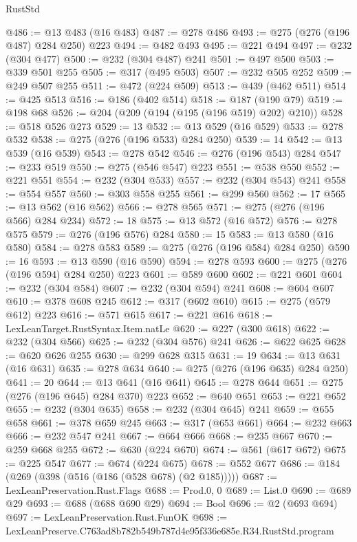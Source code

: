\begin{lexlean}{RustStd}
\begin{coremodule}
@486 := @13 @483 (@16 @483)
@487 := @278 @486
@493 := @275 (@276 (@196 @487) @284 @250) @223
@494 := @482 @493
@495 := @221 @494
@497 := @232 (@304 @477)
@500 := @232 (@304 @487) @241
@501 := @497 @500
@503 := @339 @501 @255
@505 := @317 (@495 @503)
@507 := @232 @505 @252
@509 := @249 @507 @255
@511 := @472 (@224 @509)
@513 := @439 (@462 @511)
@514 := @425 @513
@516 := @186 (@402 @514)
@518 := @187 (@190 @79)
@519 := @198 @68
@526 := @204 (@209 (@194 (@195 (@196 @519) @202) @210))
@528 := @518 @526 @273
@529 := 13
@532 := @13 @529 (@16 @529)
@533 := @278 @532
@538 := @275 (@276 (@196 @533) @284 @250)
@539 := 14
@542 := @13 @539 (@16 @539)
@543 := @278 @542
@546 := @276 (@196 @543) @284
@547 := @233 @519
@550 := @275 (@546 @547) @223
@551 := @538 @550
@552 := @221 @551
@554 := @232 (@304 @533)
@557 := @232 (@304 @543) @241
@558 := @554 @557
@560 := @303 @558 @255
@561 := @299 @560
@562 := 17
@565 := @13 @562 (@16 @562)
@566 := @278 @565
@571 := @275 (@276 (@196 @566) @284 @234)
@572 := 18
@575 := @13 @572 (@16 @572)
@576 := @278 @575
@579 := @276 (@196 @576) @284
@580 := 15
@583 := @13 @580 (@16 @580)
@584 := @278 @583
@589 := @275 (@276 (@196 @584) @284 @250)
@590 := 16
@593 := @13 @590 (@16 @590)
@594 := @278 @593
@600 := @275 (@276 (@196 @594) @284 @250) @223
@601 := @589 @600
@602 := @221 @601
@604 := @232 (@304 @584)
@607 := @232 (@304 @594) @241
@608 := @604 @607
@610 := @378 @608 @245
@612 := @317 (@602 @610)
@615 := @275 (@579 @612) @223
@616 := @571 @615
@617 := @221 @616
@618 := LexLeanTarget.RustSyntax.Item.natLe
@620 := @227 (@300 @618)
@622 := @232 (@304 @566)
@625 := @232 (@304 @576) @241
@626 := @622 @625
@628 := @620 @626 @255
@630 := @299 @628 @315
@631 := 19
@634 := @13 @631 (@16 @631)
@635 := @278 @634
@640 := @275 (@276 (@196 @635) @284 @250)
@641 := 20
@644 := @13 @641 (@16 @641)
@645 := @278 @644
@651 := @275 (@276 (@196 @645) @284 @370) @223
@652 := @640 @651
@653 := @221 @652
@655 := @232 (@304 @635)
@658 := @232 (@304 @645) @241
@659 := @655 @658
@661 := @378 @659 @245
@663 := @317 (@653 @661)
@664 := @232 @663
@666 := @232 @547 @241
@667 := @664 @666
@668 := @235 @667
@670 := @259 @668 @255
@672 := @630 (@224 @670)
@674 := @561 (@617 @672)
@675 := @225 @547
@677 := @674 (@224 @675)
@678 := @552 @677
@686 := @184 (@269 (@398 (@516 (@186 (@528 @678) (@2 @185)))))
@687 := LexLeanPreservation.Rust.Flags
@688 := Prod.{0, 0}
@689 := List.{0}
@690 := @689 @29
@693 := @688 (@688 @690 @29)
@694 := Bool
@696 := @2 (@693 @694)
@697 := LexLeanPreservation.Rust.FunOK
@698 := LexLeanPreserve.C763ad8b782b549b787d4e95f336e685e.R34.RustStd.program

\end{coremodule}
\end{lexlean}
